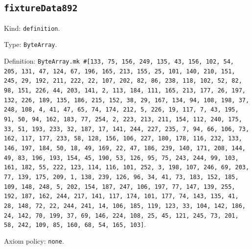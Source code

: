 \documentclass[11pt]{article}
\begin{document}
\subsection*{\texttt{fixtureData892}}
\noindent Kind: \texttt{definition}.\par
\noindent Type: \texttt{ByteArray}.\par
\noindent Definition: \texttt{ByteArray.mk \#[133, 75, 156, 249, 135, 43, 156, 102, 54, 205, 131, 47, 124, 67, 196, 165, 213, 155, 25, 101, 140, 210, 151, 245, 29, 192, 211, 222, 22, 107, 202, 82, 86, 238, 118, 102, 52, 82, 98, 151, 226, 44, 203, 141, 2, 113, 184, 111, 165, 213, 177, 26, 197, 132, 226, 189, 135, 186, 215, 152, 38, 29, 167, 134, 94, 108, 198, 37, 248, 108, 4, 41, 47, 65, 74, 174, 212, 5, 226, 19, 117, 7, 43, 195, 91, 50, 94, 162, 183, 77, 254, 2, 223, 213, 211, 154, 112, 240, 175, 33, 51, 193, 233, 32, 187, 17, 141, 244, 227, 235, 7, 94, 66, 106, 73, 162, 117, 177, 233, 58, 128, 156, 106, 227, 180, 178, 116, 232, 133, 146, 197, 184, 50, 18, 49, 169, 22, 47, 186, 239, 140, 171, 208, 144, 49, 83, 196, 193, 154, 45, 190, 53, 126, 95, 75, 243, 244, 99, 103, 161, 182, 55, 222, 123, 114, 116, 101, 252, 3, 198, 107, 246, 69, 203, 77, 139, 175, 209, 1, 138, 239, 126, 96, 34, 41, 73, 183, 152, 185, 109, 148, 248, 5, 202, 154, 187, 247, 106, 197, 77, 147, 139, 255, 192, 187, 162, 244, 217, 141, 117, 174, 101, 177, 74, 143, 135, 41, 28, 148, 72, 22, 244, 241, 14, 106, 185, 119, 123, 33, 104, 142, 186, 24, 142, 70, 199, 37, 69, 146, 224, 108, 25, 45, 121, 245, 73, 201, 58, 242, 109, 85, 160, 68, 54, 165, 103]}.\par
\noindent Axiom policy: \texttt{none}.\par
\end{document}
